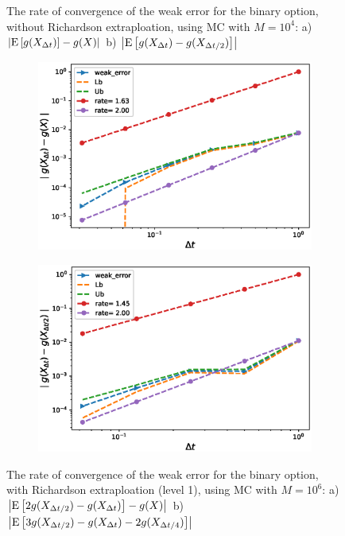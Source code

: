 \documentclass[11pt]{article}
\newcommand{\expt}[1]{\mathrm{E}\left[#1\right]}
\begin{document}
\begin{figure}[h!]
	\caption{The rate of convergence of the weak error for the binary option, without Richardson extraploation, using MC with $M=10^4$: a) $\abs{\expt{g(X_{\Delta t})}-g(X)}$  b) $\abs{\expt{g(X_{\Delta t})-g(X_{\Delta t/2})}}$ }
	\label{fig:Weak_rate_binary_without_rich}
\end{figure}
\begin{figure}[h!]
	\centering
	\begin{subfigure}{.4\textwidth}
		\centering
		\includegraphics[width=1\linewidth]{./figures/binary_weak_error/with_richardson/weak_convergence_order_binary_richardson_relative_M_5_10_6}
		\caption{}
		\label{fig:sub3}
	\end{subfigure}%
	\begin{subfigure}{.4\textwidth}
		\centering
		\includegraphics[width=1\linewidth]{./figures/binary_weak_error/with_richardson/weak_convergence_order_differences_binary_richardson_relative_M_5_10_6}
		\caption{}
		\label{fig:sub4}
	\end{subfigure}
	
	\caption{The rate of convergence of the weak error for the binary option, with Richardson extraploation (level 1), using MC with $M=10^6$: a) $\abs{\expt{2 g(X_{\Delta t/2}) -g(X_{\Delta t})}-g(X)}$  b) $\abs{\expt{3 g(X_{\Delta t/2})-g(X_{\Delta t})-2 g(X_{\Delta t/4})}}$ }
	\label{fig:fig:Weak_rate_binary_with_rich}
\end{figure}
\end{document}
